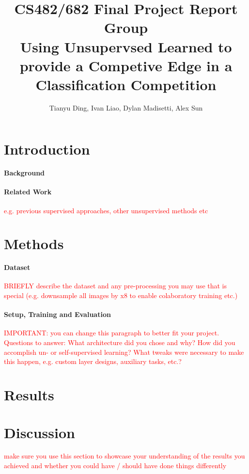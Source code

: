\documentclass[twocolumn]{article}
\title{CS482/682 Final Project Report Group \todo{XX}\\
  \large Using Unsupervsed Learned to provide a Competive Edge in a Classification
Competition}
\author{Tianyu Ding, Ivan Liao, Dylan Madisetti, Alex Sun}
\date{}
\newcommand{\todo}[1]{\textcolor{red}{#1}}
\begin{document}
  \maketitle

  \section{Introduction}

  \paragraph{Background}
  \paragraph{Related Work} \todo{e.g. previous supervised approaches, other unsupervised methods etc}

  \section{Methods}
  \paragraph{Dataset} \todo{BRIEFLY describe the dataset and any pre-processing you may use that is special (e.g. downsample all images by x8 to enable colaboratory training etc.)}

  \paragraph{Setup, Training and Evaluation} \todo{IMPORTANT: you can change this paragraph to better fit your project. Questions to answer: What architecture did you chose and why? How did you accomplish un- or self-supervised learning? What tweaks were necessary to make this happen, e.g. custom layer designs, auxiliary tasks, etc.?}



  \section{Results}


  \section{Discussion} \todo{make sure you use this section to showcase your understanding of the results you achieved and whether you could have / should have done things differently }
\end{document}

